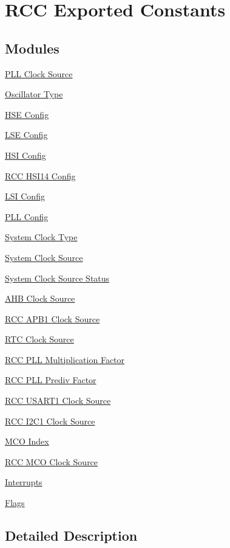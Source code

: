 \hypertarget{group___r_c_c___exported___constants}{}\section{R\+CC Exported Constants}
\label{group___r_c_c___exported___constants}
\subsection*{Modules}
\begin{DoxyCompactItemize}
\item 
\hyperlink{group___r_c_c___p_l_l___clock___source}{P\+L\+L Clock Source}
\item 
\hyperlink{group___r_c_c___oscillator___type}{Oscillator Type}
\item 
\hyperlink{group___r_c_c___h_s_e___config}{H\+S\+E Config}
\item 
\hyperlink{group___r_c_c___l_s_e___config}{L\+S\+E Config}
\item 
\hyperlink{group___r_c_c___h_s_i___config}{H\+S\+I Config}
\item 
\hyperlink{group___r_c_c___h_s_i14___config}{R\+C\+C H\+S\+I14 Config}
\item 
\hyperlink{group___r_c_c___l_s_i___config}{L\+S\+I Config}
\item 
\hyperlink{group___r_c_c___p_l_l___config}{P\+L\+L Config}
\item 
\hyperlink{group___r_c_c___system___clock___type}{System Clock Type}
\item 
\hyperlink{group___r_c_c___system___clock___source}{System Clock Source}
\item 
\hyperlink{group___r_c_c___system___clock___source___status}{System Clock Source Status}
\item 
\hyperlink{group___r_c_c___a_h_b___clock___source}{A\+H\+B Clock Source}
\item 
\hyperlink{group___r_c_c___a_p_b1___clock___source}{R\+C\+C A\+P\+B1 Clock Source}
\item 
\hyperlink{group___r_c_c___r_t_c___clock___source}{R\+T\+C Clock Source}
\item 
\hyperlink{group___r_c_c___p_l_l___multiplication___factor}{R\+C\+C P\+L\+L Multiplication Factor}
\item 
\hyperlink{group___r_c_c___p_l_l___prediv___factor}{R\+C\+C P\+L\+L Prediv Factor}
\item 
\hyperlink{group___r_c_c___u_s_a_r_t1___clock___source}{R\+C\+C U\+S\+A\+R\+T1 Clock Source}
\item 
\hyperlink{group___r_c_c___i2_c1___clock___source}{R\+C\+C I2\+C1 Clock Source}
\item 
\hyperlink{group___r_c_c___m_c_o___index}{M\+C\+O Index}
\item 
\hyperlink{group___r_c_c___m_c_o___clock___source}{R\+C\+C M\+C\+O Clock Source}
\item 
\hyperlink{group___r_c_c___interrupt}{Interrupts}
\item 
\hyperlink{group___r_c_c___flag}{Flags}
\end{DoxyCompactItemize}


\subsection{Detailed Description}
